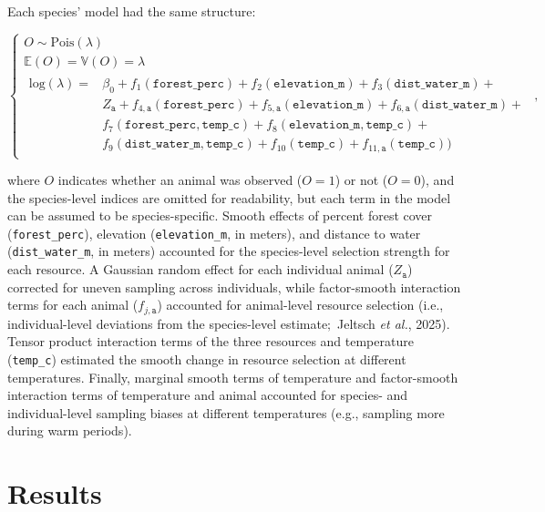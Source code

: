 \documentclass[
  12pt,
]{article}
\begin{document}
Each species' model had the same structure:

\begin{equation}\label{eq:hrsf}
\begin{cases}
O \sim \text{Pois}(\lambda) \\
\mathbb E(O) = \mathbb V(O) = \lambda \\
\begin{aligned}
\text{log}(\lambda) = & \beta_0 + f_{1}(\texttt{forest\_perc}) + f_{2}(\texttt{elevation\_m}) + f_{3}(\texttt{dist\_water\_m}) + \\
& Z_\texttt a + f_{4, \texttt{a}}(\texttt{forest\_perc}) + f_{5, \texttt{a}}(\texttt{elevation\_m}) + f_{6, \texttt{a}}(\texttt{dist\_water\_m}) + \\
& f_{7}(\texttt{forest\_perc}, \texttt{temp\_c}) + f_{8}(\texttt{elevation\_m}, \texttt{temp\_c}) + \\
& f_{9}(\texttt{dist\_water\_m}, \texttt{temp\_c}) + f_{10}(\texttt{temp\_c}) + f_{11,\texttt a}(\texttt{temp\_c}))
\end{aligned}
\end{cases},
\end{equation}

\noindent where \(O\) indicates whether an animal was observed (\(O = 1\)) or not (\(O = 0\)), and the species-level indices are omitted for readability, but each term in the model can be assumed to be species-specific. Smooth effects of percent forest cover (\texttt{forest\_perc}), elevation (\texttt{elevation\_m}, in meters), and distance to water (\texttt{dist\_water\_m}, in meters) accounted for the species-level selection strength for each resource. A Gaussian random effect for each individual animal (\(Z_\texttt a\)) corrected for uneven sampling across individuals, while factor-smooth interaction terms for each animal (\(f_{j,\texttt a}\)) accounted for animal-level resource selection (i.e., individual-level deviations from the species-level estimate\(;\) Jeltsch \emph{et al.}, 2025). Tensor product interaction terms of the three resources and temperature (\texttt{temp\_c}) estimated the smooth change in resource selection at different temperatures. Finally, marginal smooth terms of temperature and factor-smooth interaction terms of temperature and animal accounted for species- and individual-level sampling biases at different temperatures (e.g., sampling more during warm periods).

\section{Results}\label{results}
\end{document}
